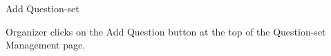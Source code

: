 
\begin{uc}{Add Question-set}


    \begin{uc-trig}
        Organizer clicks on the Add Question button at the top of the Question-set
        Management page.
    \end{uc-trig}

\end{uc}

